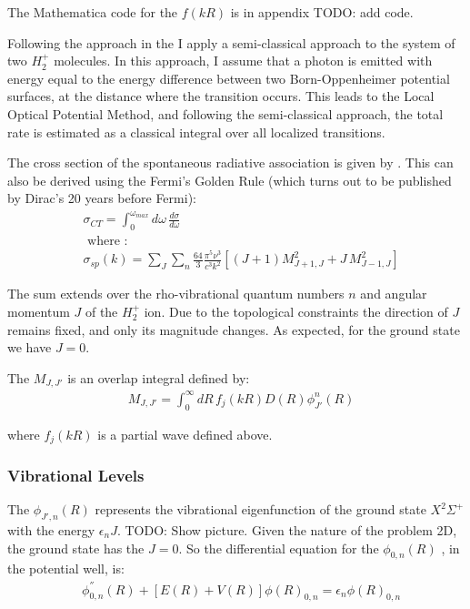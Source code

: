 The Mathematica code for the $  f(kR) $ is in appendix TODO: add code.

Following the approach in the \cite{ZL} I apply a semi-classical approach to the system of two $ H_2^{+} $ molecules. In this approach, I assume that a photon is emitted with energy equal to the energy difference between two Born-Oppenheimer potential surfaces, at the distance where the transition occurs. This leads to the Local Optical Potential Method, and following the semi-classical approach, the total rate is estimated as a classical integral over all localized transitions. 

The cross section of the spontaneous radiative association is given by \cite{Zygelman1} .  This can also be derived using the Fermi's Golden Rule (which turns out to be published by Dirac's 20 years before Fermi)\cite{FermiGR}:
\begin{equation}
\begin{split}
& \sigma_{CT}  = \int_0^{\omega_{max}}{d\omega\,\frac{d\sigma}{d\omega}} \\[.8em]
& \text{ where }: \\[.8em]
& \sigma_{sp}(k) = \sum_J\sum_n{\frac{64}{3}\frac{\pi^5\nu^3}{c^3k^2}\left[(J+1)M_{J+1,J}^2 + J\,M_{J-1,J}^2 \right] }
\end{split}
\end{equation}

The sum extends over the rho-vibrational quantum numbers $ n $ and angular momentum $ J $ of the $ H_2^{+} $ ion. Due to the topological constraints the direction of $ J $ remains fixed, and only its magnitude changes. As expected, for the ground state we have $ J = 0 $. 

The $ M_{J,J'}  $ is an overlap integral defined by:
\begin{equation}
\begin{split}
& M_{J,J'} = \int_0^{\infty}{dR\,f_j(kR)D(R)\phi_{J'}^n(R)}
\end{split}
\end{equation}

where $ f_j(kR) $ is a partial wave defined above. 

\subsubsection{Vibrational Levels}

The $ \phi_{J',n}(R) $ represents the vibrational eigenfunction of the ground state   $ X^2\Sigma^{+} $ with the energy $ \epsilon_nJ $. TODO: Show picture.   Given the nature of the problem 2D, the ground state has the $ J = 0 $. So the differential equation for the  $ \phi_{0,n}(R) $ , in the potential well, is:
\begin{equation}
\begin{split}
& \phi_{0,n}^{''}(R) + \left[ E(R) + V(R)  \right]\phi(R)_{0,n} = \epsilon_n \phi(R)_{0,n}
\end{split}
\end{equation}

